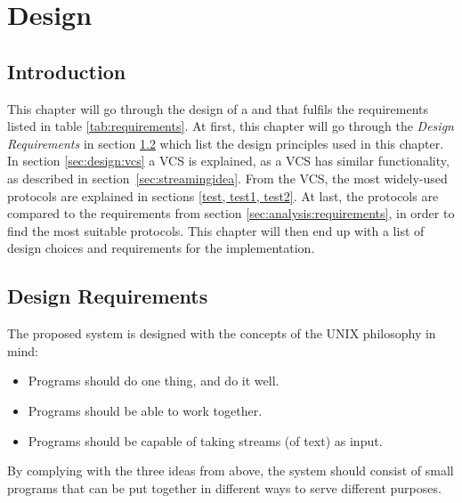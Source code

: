 \chapter{Design} \label{chp:design}

\section{Introduction}
This chapter will go through the design of a  and  that fulfils the requirements listed in table \ref{tab:requirements}.
At first, this chapter will go through the \textit{Design Requirements} in section \ref{sec:design:requirements} which list the design principles used in this chapter.
In section \ref{sec:design:vcs} a \ac{VCS} is explained, as a \ac{VCS} has similar functionality, as described in section~\ref{sec:streamingidea}.
From the \ac{VCS}, the most widely-used protocols are explained in sections \cref{test, test1, test2}.
At last, the protocols are compared to the requirements from section \ref{sec:analysis:requirements}, in order to find the most suitable protocols.
This chapter will then end up with a list of design choices and requirements for the implementation.

\section{Design Requirements} \label{sec:design:requirements}
The proposed system is designed with the concepts of the UNIX philosophy in mind:
\begin{itemize}
	\item Programs should do one thing, and do it well.
	\item Programs should be able to work together.
	\item Programs should be capable of taking streams (of text) as input.
\end{itemize}



By complying with the three ideas from above, the system should consist of small programs that can be put together in different ways to serve different purposes.


